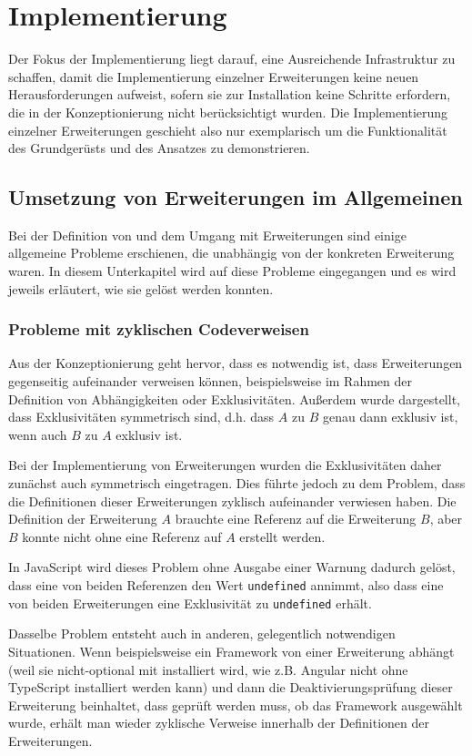 \section{Implementierung}
\label{implementierung}

Der Fokus der Implementierung liegt darauf, eine Ausreichende Infrastruktur zu schaffen, damit die Implementierung einzelner Erweiterungen keine neuen Herausforderungen aufweist, sofern sie zur Installation keine Schritte erfordern, die in der Konzeptionierung nicht berücksichtigt wurden. Die Implementierung einzelner Erweiterungen geschieht also nur exemplarisch um die Funktionalität des Grundgerüsts und des Ansatzes zu demonstrieren.

\subsection{Umsetzung von Erweiterungen im Allgemeinen}
Bei der Definition von und dem Umgang mit Erweiterungen sind einige allgemeine Probleme erschienen, die unabhängig von der konkreten Erweiterung waren. In diesem Unterkapitel wird auf diese Probleme eingegangen und es wird jeweils erläutert, wie sie gelöst werden konnten.

\subsubsection{Probleme mit zyklischen Codeverweisen}
Aus der Konzeptionierung geht hervor, dass es notwendig ist, dass Erweiterungen gegenseitig aufeinander verweisen können, beispielsweise im Rahmen der Definition von Abhängigkeiten oder Exklusivitäten. Außerdem wurde dargestellt, dass Exklusivitäten symmetrisch sind, d.h. dass $A$ zu $B$ genau dann exklusiv ist, wenn auch $B$ zu $A$ exklusiv ist.

Bei der Implementierung von Erweiterungen wurden die Exklusivitäten daher zunächst auch symmetrisch eingetragen. Dies führte jedoch zu dem Problem, dass die Definitionen dieser Erweiterungen zyklisch aufeinander verwiesen haben. Die Definition der Erweiterung $A$ brauchte eine Referenz auf die Erweiterung $B$, aber $B$ konnte nicht ohne eine Referenz auf $A$ erstellt werden.

In JavaScript wird dieses Problem ohne Ausgabe einer Warnung dadurch gelöst, dass eine von beiden Referenzen den Wert \verb|undefined| annimmt, also dass eine von beiden Erweiterungen eine Exklusivität zu \verb|undefined| erhält.

Dasselbe Problem entsteht auch in anderen, gelegentlich notwendigen Situationen. Wenn beispielsweise ein Framework von einer Erweiterung abhängt (weil sie nicht-optional mit installiert wird, wie z.B. Angular nicht ohne TypeScript installiert werden kann) und dann die Deaktivierungsprüfung dieser Erweiterung beinhaltet, dass geprüft werden muss, ob das Framework ausgewählt wurde, erhält man wieder zyklische Verweise innerhalb der Definitionen der Erweiterungen.

